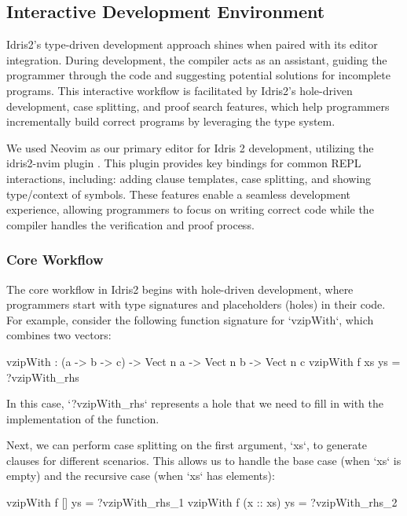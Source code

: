 \documentclass[]{rptuseminar}
\begin{document}
\subsection{Interactive Development Environment}  
\label{sec:interactive-development-environment}
Idris2's type-driven development approach shines when paired with its editor integration. During development, the compiler acts as an assistant, guiding the programmer through the code and suggesting potential solutions for incomplete programs. This interactive workflow is facilitated by Idris2's hole-driven development, case splitting, and proof search features, which help programmers incrementally build correct programs by leveraging the type system.

We used Neovim as our primary editor for Idris 2 development, utilizing the idris2-nvim plugin \cite{repo-key}. This plugin provides key bindings for common REPL interactions, including: adding clause templates, case splitting, and showing type/context of symbols. These features enable a seamless development experience, allowing programmers to focus on writing correct code while the compiler handles the verification and proof process. 

\subsubsection{Core Workflow}
The core workflow in Idris2 begins with hole-driven development, where programmers start with type signatures and placeholders (holes) in their code. For example, consider the following function signature for `vzipWith`, which combines two vectors:

\begin{idris}
vzipWith : (a -> b -> c) -> Vect n a -> Vect n b -> Vect n c
vzipWith f xs ys = ?vzipWith_rhs
\end{idris}

In this case, `?vzipWith\_rhs` represents a hole that we need to fill in with the implementation of the function.

Next, we can perform case splitting on the first argument, `xs`, to generate clauses for different scenarios. This allows us to handle the base case (when `xs` is empty) and the recursive case (when `xs` has elements):

\begin{idris}  
vzipWith f [] ys = ?vzipWith_rhs_1
vzipWith f (x :: xs) ys = ?vzipWith_rhs_2
\end{idris}
\end{document}

